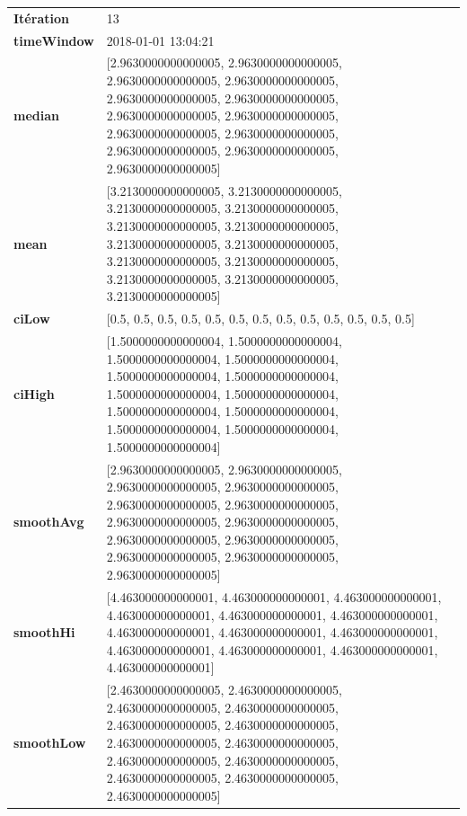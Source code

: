 \begin{table}[H]
	\centering
	\begin{tabularx}{\textwidth}{lX}
		\textbf{Itération}& 13\\
		\textbf{timeWindow}	 & 2018-01-01 13:04:21   \\
		\textbf{median} & [2.9630000000000005, 2.9630000000000005, 2.9630000000000005, 2.9630000000000005, 2.9630000000000005, 2.9630000000000005, 2.9630000000000005, 2.9630000000000005, 2.9630000000000005, 2.9630000000000005, 2.9630000000000005, 2.9630000000000005, 2.9630000000000005] 
		\\ 
		\textbf{mean} & [3.2130000000000005, 3.2130000000000005, 3.2130000000000005, 3.2130000000000005, 3.2130000000000005, 3.2130000000000005, 3.2130000000000005, 3.2130000000000005, 3.2130000000000005, 3.2130000000000005, 3.2130000000000005, 3.2130000000000005, 3.2130000000000005] 
		\\
		\textbf{ciLow} &  [0.5, 0.5, 0.5, 0.5, 0.5, 0.5, 0.5, 0.5, 0.5, 0.5, 0.5, 0.5, 0.5] \\
		\textbf{ciHigh}& [1.5000000000000004, 1.5000000000000004, 1.5000000000000004, 1.5000000000000004, 1.5000000000000004, 1.5000000000000004, 1.5000000000000004, 1.5000000000000004, 1.5000000000000004, 1.5000000000000004, 1.5000000000000004, 1.5000000000000004, 1.5000000000000004] 
		\\
		\textbf{smoothAvg} & [2.9630000000000005, 2.9630000000000005, 2.9630000000000005, 2.9630000000000005, 2.9630000000000005, 2.9630000000000005, 2.9630000000000005, 2.9630000000000005, 2.9630000000000005, 2.9630000000000005, 2.9630000000000005, 2.9630000000000005, 2.9630000000000005] 
		\\
		\textbf{smoothHi} & [4.463000000000001, 4.463000000000001, 4.463000000000001, 4.463000000000001, 4.463000000000001, 4.463000000000001, 4.463000000000001, 4.463000000000001, 4.463000000000001, 4.463000000000001, 4.463000000000001, 4.463000000000001, 4.463000000000001] 
		\\
		\textbf{smoothLow} & [2.4630000000000005, 2.4630000000000005, 2.4630000000000005, 2.4630000000000005, 2.4630000000000005, 2.4630000000000005, 2.4630000000000005, 2.4630000000000005, 2.4630000000000005, 2.4630000000000005, 2.4630000000000005, 2.4630000000000005, 2.4630000000000005]
		
		\\ 
	\end{tabularx} 
\end{table}


